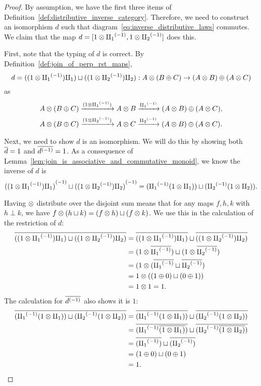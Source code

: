 \begin{proof}
  By assumption, we have the first three items of
  Definition~\ref{def:distributive_inverse_category}. Therefore, we need to construct an
  isomorphism $d$ such that diagram~\ref{eq:inverse_distributive_laws} commutes. We claim that the
  map $d = [1\otimes {\amalg_{1}}^{(-1)}, 1\otimes {\amalg_{2}}^{(-1)}]$ does this.

  First, note that the typing of $d$ is correct. By Definition~\ref{def:join_of_perp_rst_maps},
  \[
    d = ((1 \otimes {\amalg_{1}}^{(-1)}) \amalg_{1} )\sqcup ((1\otimes{\amalg_{2}}^{(-1)}) \amalg_{2}) : A \otimes (B \oplus C) \to (A\otimes B)\oplus(A\otimes C)
  \]
  as
  \begin{align*}
      A \otimes (B \oplus C) & \xrightarrow{(1\otimes{\amalg_{1}}^{(-1)})} A\otimes B \xrightarrow{{\amalg_{1}}^{(-1)}} (A\otimes B)\oplus(A\otimes C),\\
      A \otimes (B \oplus C) & \xrightarrow{(1\otimes{\amalg_{2}}^{(-1)})} A\otimes C \xrightarrow{{\amalg_{2}}^{(-1)}} (A\otimes B)\oplus(A\otimes C).
  \end{align*}

  Next, we need to show $d$ is an isomorphism. We will do this by showing both $\overline{d} = 1$ and
  $\overline{{d}^{(-1)}} = 1$.
  As a consequence of Lemma~\ref{lem:join_is_associative_and_commutative_monoid}, we know
  the inverse of $d$ is
  \[
    {((1 \otimes {\amalg_{1}}^{(-1)}) \amalg_{1} )}^{(-1)}\sqcup {((1\otimes\ensuremath{{\amalg_{2}}^{(-1)}}) \amalg_{2})}^{(-1)} =
      ( {\amalg_{1}}^{(-1)}(1 \otimes \amalg_{1}) ) \sqcup ( {\amalg_{2}}^{(-1)}(1\otimes\amalg_{2})).
  \]

  Having $\otimes$ distribute over the disjoint sum means that for any maps $f,h,k$ with $h\perp k$, we
  have $f \otimes (h\sqcup k) = (f\otimes h) \sqcup (f\otimes k)$. We use this in the calculation of the restriction
  of $d$:
  \begin{align*}
    \overline{((1 \otimes {\amalg_{1}}^{(-1)}) \amalg_{1} )\sqcup ((1\otimes{\amalg_{2}}^{(-1)}) \amalg_{2})}
      &= \overline{((1 \otimes {\amalg_{1}}^{(-1)}) \amalg_{1} )}\sqcup \overline{((1\otimes{\amalg_{2}}^{(-1)}) \amalg_{2})} \\
      &= (1\otimes \overline{{\amalg_{1}}^{(-1)}}) \sqcup (1\otimes \overline{{\amalg_{2}}^{(-1)}}) \\
      &= (1\otimes (\overline{{\amalg_{1}}^{(-1)}} \sqcup \overline{{\amalg_{2}}^{(-1)}}) \\
      &= 1\otimes ((1\oplus0) \sqcup (0\oplus1) )\\
      &=1 \otimes 1 = 1.
  \end{align*}
  The calculation for $\overline{{d}^{(-1)}}$ also shows it is $1$:
  \begin{align*}
    \overline{( {\amalg_{1}}^{(-1)}(1 \otimes \amalg_{1}) ) \sqcup ( {\amalg_{2}}^{(-1)}(1\otimes\amalg_{2}))}
      &= \overline{({\amalg_{1}}^{(-1)}(1 \otimes \amalg_{1}) )}\sqcup \overline{({\amalg_{2}}^{(-1)}(1\otimes\amalg_{2}))} \\
      &= \overline{({\amalg_{1}}^{(-1)}\overline{(1 \otimes \amalg_{1})} )}\sqcup \overline{({\amalg_{2}}^{(-1)}\overline{(1\otimes\amalg_{2})})} \\
      &= \overline{({\amalg_{1}}^{(-1)})}\sqcup \overline{({\amalg_{2}}^{(-1)})}\\
      &= (1\oplus0) \sqcup (0\oplus1) \\
      &= 1.
  \end{align*}


\end{proof}
